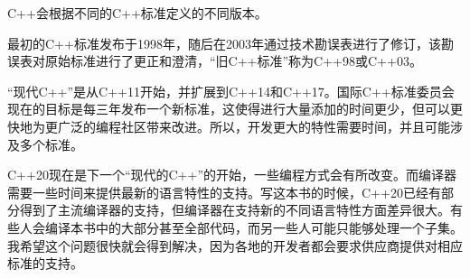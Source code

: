 
C++会根据不同的C++标准定义的不同版本。

最初的C++标准发布于1998年，随后在2003年通过技术勘误表进行了修订，该勘误表对原始标准进行了更正和澄清，“旧C++标准”称为C++98或C++03。

“现代C++”是从C++11开始，并扩展到C++14和C++17。国际C++标准委员会现在的目标是每三年发布一个新标准，这使得进行大量添加的时间更少，但可以更快地为更广泛的编程社区带来改进。所以，开发更大的特性需要时间，并且可能涉及多个标准。

C++20现在是下一个“现代的C++”的开始，一些编程方式会有所改变。而编译器需要一些时间来提供最新的语言特性的支持。写这本书的时候，C++20已经有部分得到了主流编译器的支持，但编译器在支持新的不同语言特性方面差异很大。有些人会编译本书中的大部分甚至全部代码，而另一些人可能只能够处理一个子集。我希望这个问题很快就会得到解决，因为各地的开发者都会要求供应商提供对相应标准的支持。